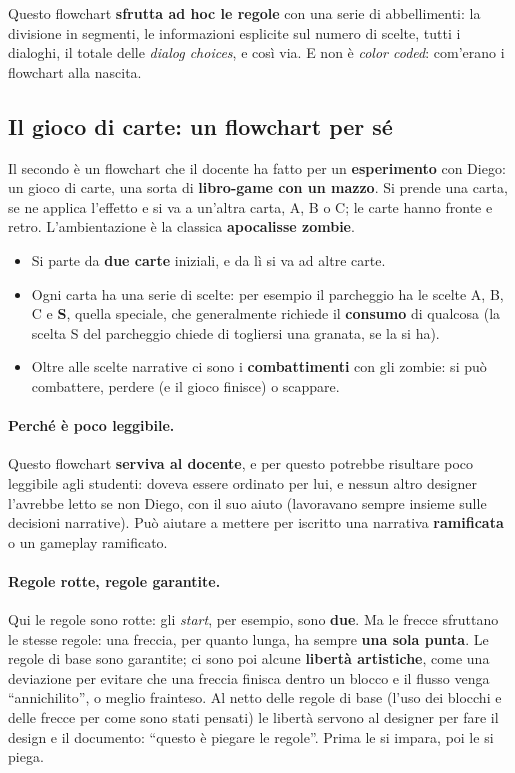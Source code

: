 Questo flowchart \textbf{sfrutta ad hoc le regole} con una serie di
abbellimenti: la divisione in segmenti, le informazioni esplicite sul numero
di scelte, tutti i dialoghi, il totale delle \emph{dialog choices}, e così
via. E non è \emph{color coded}: com'erano i flowchart alla nascita.

\subsection{Il gioco di carte: un flowchart per sé}

Il secondo è un flowchart che il docente ha fatto per un \textbf{esperimento}
con Diego: un gioco di carte, una sorta di \textbf{libro-game con un mazzo}.
Si prende una carta, se ne applica l'effetto e si va a un'altra carta, A, B
o C; le carte hanno fronte e retro. L'ambientazione è la classica
\textbf{apocalisse zombie}.
\begin{itemize}
  \item Si parte da \textbf{due carte} iniziali, e da lì si va ad altre carte.
  \item Ogni carta ha una serie di scelte: per esempio il parcheggio ha le
        scelte A, B, C e \textbf{S}, quella speciale, che generalmente
        richiede il \textbf{consumo} di qualcosa (la scelta S del parcheggio
        chiede di togliersi una granata, se la si ha).
  \item Oltre alle scelte narrative ci sono i \textbf{combattimenti} con gli
        zombie: si può combattere, perdere (e il gioco finisce) o scappare.
\end{itemize}

\paragraph{Perché è poco leggibile.} Questo flowchart \textbf{serviva al
docente}, e per questo potrebbe risultare poco leggibile agli studenti: doveva
essere ordinato per lui, e nessun altro designer l'avrebbe letto se non
Diego, con il suo aiuto (lavoravano sempre insieme sulle decisioni
narrative). Può aiutare a mettere per iscritto una narrativa
\textbf{ramificata} o un gameplay ramificato.

\paragraph{Regole rotte, regole garantite.} Qui le regole sono rotte: gli
\emph{start}, per esempio, sono \textbf{due}. Ma le frecce sfruttano le stesse
regole: una freccia, per quanto lunga, ha sempre \textbf{una sola punta}. Le
regole di base sono garantite; ci sono poi alcune \textbf{libertà
artistiche}, come una deviazione per evitare che una freccia finisca dentro
un blocco e il flusso venga ``annichilito'', o meglio frainteso. Al netto
delle regole di base (l'uso dei blocchi e delle frecce per come sono stati
pensati) le libertà servono al designer per fare il design e il documento:
``questo è piegare le regole''. Prima le si impara, poi le si piega.

